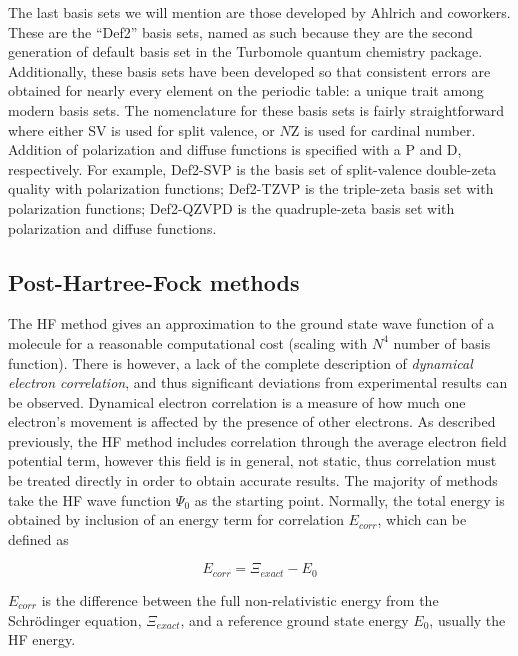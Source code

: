 The last basis sets we will mention are those developed by Ahlrich and
coworkers.\cite{Schafer1992, Weigend2005} These are the ``Def2'' basis sets,
named as such because they are the second generation of default basis set in
the Turbomole quantum chemistry package.\cite{turbomole} Additionally, these
basis sets have been developed so that consistent errors are obtained for
nearly every element on the periodic table: a unique trait among modern basis
sets. The nomenclature for these basis sets is fairly straightforward where
either SV is used for split valence, or $N$Z is used for cardinal number.
Addition of polarization and diffuse functions is specified with a P and D,
respectively. For example, Def2-SVP is the basis set of split-valence
double-zeta quality with polarization functions; Def2-TZVP is the triple-zeta
basis set with polarization functions; Def2-QZVPD is the quadruple-zeta basis
set with polarization and diffuse functions.

\subsection{Post-Hartree-Fock methods}

The HF method gives an approximation to the ground state wave function of a
molecule for a reasonable computational cost (scaling with $N^4$ number of
basis function). There is however, a lack of the complete description of
\emph{dynamical electron correlation},\cite{Cramer2004} and thus significant
deviations from experimental results can be observed. Dynamical electron
correlation is a measure of how much one electron's movement is affected by the
presence of other electrons. As described previously, the HF method includes
correlation through the average electron field potential term, however this
field is in general, not static, thus correlation must be treated directly in
order to obtain accurate results. The majority of methods take the HF wave
function $\Psi_0$ as the starting point. Normally, the total energy is obtained
by inclusion of an energy term for correlation $E_{corr}$, which can be defined
as

\begin{equation}
  E_{corr} = \Xi_{exact} - E_0
\end{equation}

\noindent $E_{corr}$ is the difference between the full non-relativistic energy
from the Schr{\"o}dinger equation, $\Xi_{exact}$, and a reference ground state
energy $E_0$, usually the HF energy.

